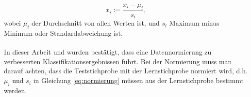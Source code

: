 \begin{equation} \label{eq:normierung}
x_i := \frac{x_i - \mu_i}{s_i},
\end{equation}
wobei $\mu_i$ der Durchschnitt von allen Werten ist, und $s_i$ Maximum minus Minimum oder Standardabweichung ist.

\paragraph{}
In dieser Arbeit und \cite{mekonnen92} wurden best\"atigt, dass eine Datennormierung zu verbesserten Klassifikationsergebnissen f\"uhrt. Bei der Normierung muss man darauf achten, dass die Teststichprobe mit der Lernstichprobe normiert wird, d.h. $\mu_i$ und $s_i$ in Gleichung \ref{eq:normierung} m\"ussen aus der Lernstichprobe bestimmt werden.